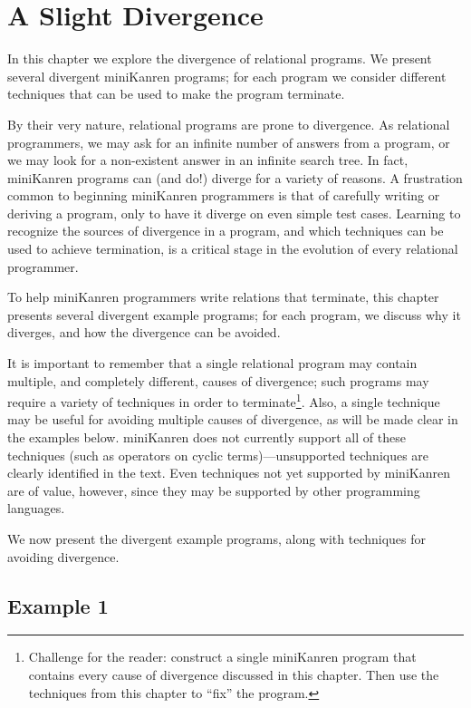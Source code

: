 \chapter{A Slight Divergence}\label{divergencechapter}

In this chapter we explore the divergence of relational programs.  We
present several divergent miniKanren programs; for each program we
consider different techniques that can be used to make the program
terminate.

By their very nature, relational programs are prone to divergence.  As
relational programmers, we may ask for an infinite number of answers
from a program, or we may look for a non-existent answer in an
infinite search tree.  In fact, miniKanren programs can (and do!)
diverge for a variety of reasons.  A frustration common to beginning
miniKanren programmers is that of carefully writing or deriving a
program, only to have it diverge on even simple test cases.  Learning
to recognize the sources of divergence in a program, and which
techniques can be used to achieve termination, is a critical stage in
the evolution of every relational programmer.

To help miniKanren programmers write relations that terminate, this
chapter presents several divergent example programs; for each program,
we discuss why it diverges, and how the divergence can be avoided.

It is important to remember that a single relational program may
contain multiple, and completely different, causes of divergence; such
programs may require a variety of techniques in order to
terminate\footnote{Challenge for the reader: construct a single
miniKanren program that contains every cause of divergence discussed
in this chapter.  Then use the techniques from this chapter to ``fix''
the program.}.  Also, a single technique may be useful for avoiding
multiple causes of divergence, as will be made clear in the examples
below.  miniKanren does not currently support all of these
techniques (such as operators on cyclic terms)---unsupported
techniques are clearly identified in the text.  Even techniques not
yet supported by miniKanren are of value, however, since they may be
supported by other programming languages.

We now present the divergent example programs, along with techniques
for avoiding divergence.  


\section*{Example 1}

